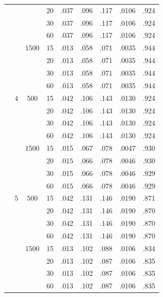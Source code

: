 \begin{table}[H]
\begin{tabular}{ccccrrrrr}
 &  &  & 20 & .037 & .096 & .117 & .0106 & .924 \\
 &  &  & 30 & .037 & .096 & .117 & .0106 & .924 \\
 &  &  & 60 & .037 & .096 & .117 & .0106 & .924 \\
 &  & 1500 & 15 & .013 & .058 & .071 & .0035 & .944 \\
 &  &  & 20 & .013 & .058 & .071 & .0035 & .944 \\
 &  &  & 30 & .013 & .058 & .071 & .0035 & .944 \\
 &  &  & 60 & .013 & .058 & .071 & .0035 & .944 \\
 & 4 & 500 & 15 & .042 & .106 & .143 & .0130 & .924 \\
 &  &  & 20 & .042 & .106 & .143 & .0130 & .924 \\
 &  &  & 30 & .042 & .106 & .143 & .0130 & .924 \\
 &  &  & 60 & .042 & .106 & .143 & .0130 & .924 \\
 &  & 1500 & 15 & .015 & .067 & .078 & .0047 & .930 \\
 &  &  & 20 & .015 & .066 & .078 & .0046 & .930 \\
 &  &  & 30 & .015 & .066 & .078 & .0046 & .929 \\
 &  &  & 60 & .015 & .066 & .078 & .0046 & .929 \\
 & 5 & 500 & 15 & .042 & .131 & .146 & .0190 & .871 \\
 &  &  & 20 & .042 & .131 & .146 & .0190 & .870 \\
 &  &  & 30 & .042 & .131 & .146 & .0190 & .870 \\
 &  &  & 60 & .042 & .131 & .146 & .0190 & .870 \\
 &  & 1500 & 15 & .013 & .102 & .088 & .0106 & .834 \\
 &  &  & 20 & .013 & .102 & .087 & .0106 & .835 \\
 &  &  & 30 & .013 & .102 & .087 & .0106 & .835 \\
 &  &  & 60 & .013 & .102 & .087 & .0106 & .835 \\
\bottomrule
\end{tabular}
\end{table}
